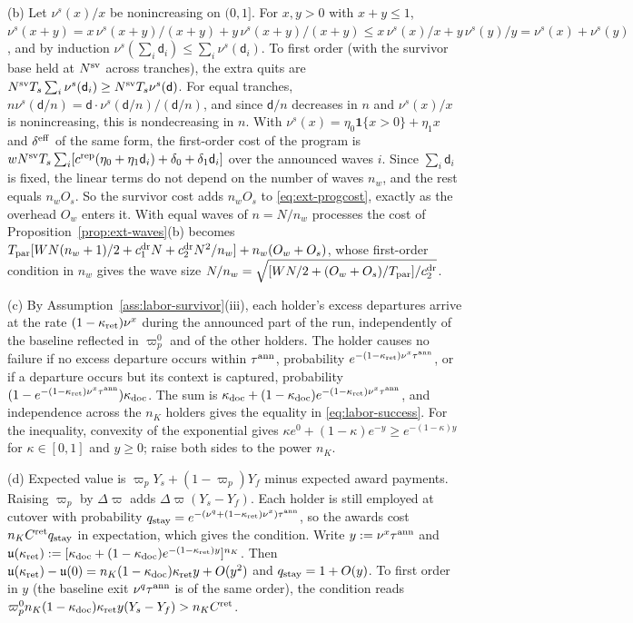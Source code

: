 (b) Let $\nu^s(x)/x$ be nonincreasing on $(0,1]$. For $x,y>0$ with $x+y\le1$, $\nu^s(x+y)=x\,\nu^s(x+y)/(x+y)+y\,\nu^s(x+y)/(x+y)\le x\,\nu^s(x)/x+y\,\nu^s(y)/y=\nu^s(x)+\nu^s(y)$, and by induction $\nu^s(\sum_i\mathsf d_i)\le\sum_i\nu^s(\mathsf d_i)$. To first order (with the survivor base held at $N^{\rm sv}$ across tranches), the extra quits are $N^{\rm sv}T_s\sum_i\nu^s(\mathsf d_i)\ge N^{\rm sv}T_s\nu^s(\mathsf d)$. For equal tranches, $n\nu^s(\mathsf d/n)=\mathsf d\cdot\nu^s(\mathsf d/n)/(\mathsf d/n)$, and since $\mathsf d/n$ decreases in $n$ and $\nu^s(x)/x$ is nonincreasing, this is nondecreasing in $n$. With $\nu^s(x)=\eta_0\mathbf1\{x>0\}+\eta_1x$ and $\delta^{\rm eff}$ of the same form, the first-order cost of the program is $wN^{\rm sv}T_s\sum_i[c^{\rm rep}(\eta_0+\eta_1\mathsf d_i)+\delta_0+\delta_1\mathsf d_i]$ over the announced waves $i$. Since $\sum_i\mathsf d_i$ is fixed, the linear terms do not depend on the number of waves $n_w$, and the rest equals $n_wO_s$. So the survivor cost adds $n_wO_s$ to \eqref{eq:ext-progcost}, exactly as the overhead $O_w$ enters it. With equal waves of $n=N/n_w$ processes the cost of Proposition~\ref{prop:ext-waves}(b) becomes $T_{\rm par}[WN(n_w+1)/2+c^{\rm dr}_1N+c^{\rm dr}_2N^2/n_w]+n_w(O_w+O_s)$, whose first-order condition in $n_w$ gives the wave size $N/n_w=\sqrt{[WN/2+(O_w+O_s)/T_{\rm par}]/c^{\rm dr}_2}$.

(c) By Assumption~\ref{ass:labor-survivor}(iii), each holder's excess departures arrive at the rate $(1-\kappa_{\rm ret})\nu^x$ during the announced part of the run, independently of the baseline reflected in $\varpi^0_p$ and of the other holders. The holder causes no failure if no excess departure occurs within $\tau^{\rm ann}$, probability $e^{-(1-\kappa_{\rm ret})\nu^x\tau^{\rm ann}}$, or if a departure occurs but its context is captured, probability $(1-e^{-(1-\kappa_{\rm ret})\nu^x\tau^{\rm ann}})\kappa_{\rm doc}$. The sum is $\kappa_{\rm doc}+(1-\kappa_{\rm doc})e^{-(1-\kappa_{\rm ret})\nu^x\tau^{\rm ann}}$, and independence across the $n_K$ holders gives the equality in \eqref{eq:labor-success}. For the inequality, convexity of the exponential gives $\kappa e^0+(1-\kappa)e^{-y}\ge e^{-(1-\kappa)y}$ for $\kappa\in[0,1]$ and $y\ge0$; raise both sides to the power $n_K$.

(d) Expected value is $\varpi_pY_s+(1-\varpi_p)Y_f$ minus expected award payments. Raising $\varpi_p$ by $\Delta\varpi$ adds $\Delta\varpi(Y_s-Y_f)$. Each holder is still employed at cutover with probability $q_{\rm stay}=e^{-(\nu^q+(1-\kappa_{\rm ret})\nu^x)\tau^{\rm ann}}$, so the awards cost $n_KC^{\rm ret}q_{\rm stay}$ in expectation, which gives the condition. Write $y:=\nu^x\tau^{\rm ann}$ and $\mathfrak u(\kappa_{\rm ret}):=[\kappa_{\rm doc}+(1-\kappa_{\rm doc})e^{-(1-\kappa_{\rm ret})y}]^{n_K}$. Then $\mathfrak u(\kappa_{\rm ret})-\mathfrak u(0)=n_K(1-\kappa_{\rm doc})\kappa_{\rm ret}y+O(y^2)$ and $q_{\rm stay}=1+O(y)$. To first order in $y$ (the baseline exit $\nu^q\tau^{\rm ann}$ is of the same order), the condition reads $\varpi^0_pn_K(1-\kappa_{\rm doc})\kappa_{\rm ret}y(Y_s-Y_f)>n_KC^{\rm ret}$.

